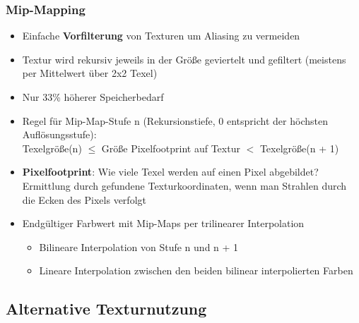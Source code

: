 \documentclass[10pt,a4paper]{article}
\begin{document}
	\subsubsection{Mip-Mapping}
	\label{tex:subs:mip_mapping}
	
	\begin{itemize}
		\item Einfache \textbf{Vorfilterung} von Texturen um Aliasing zu vermeiden
		\item Textur wird rekursiv jeweils in der Größe geviertelt und gefiltert (meistens per Mittelwert über 2x2 Texel)
		\item Nur 33\% höherer Speicherbedarf
		\item Regel für Mip-Map-Stufe n (Rekursionstiefe, 0 entspricht der höchsten Auflösungsstufe):\\Texelgröße(n) $\leq$ Größe Pixelfootprint auf Textur $<$ Texelgröße(n + 1)
		\item \textbf{Pixelfootprint}: Wie viele Texel werden auf einen Pixel abgebildet? Ermittlung durch gefundene Texturkoordinaten, wenn man Strahlen durch die Ecken des Pixels verfolgt
		\item Endgültiger Farbwert mit Mip-Maps per trilinearer Interpolation
		\begin{itemize}
			\item Bilineare Interpolation von Stufe n und n + 1
			\item Lineare Interpolation zwischen den beiden bilinear interpolierten Farben
		\end{itemize}
	\end{itemize}

	\subsection{Alternative Texturnutzung}
	\label{tex:sub:alternative_texturnutzung}
\end{document}
